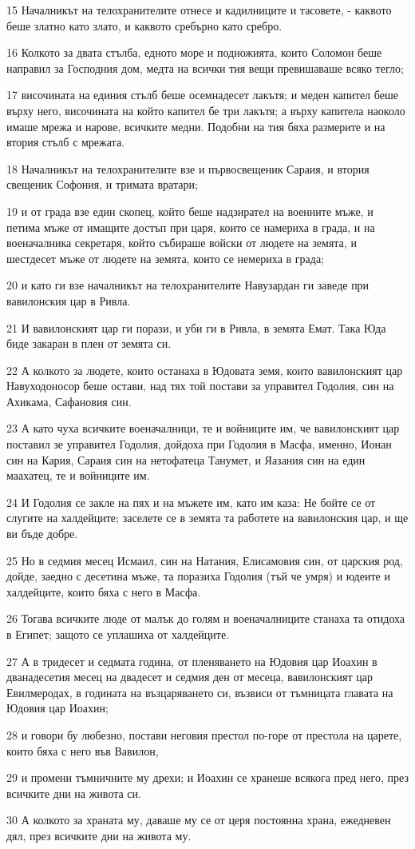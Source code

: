 \par 15 Началникът на телохранителите отнесе и кадилниците и тасовете, - каквото беше златно като злато, и каквото сребърно като сребро.
\par 16 Колкото за двата стълба, едното море и подножията, които Соломон беше направил за Господния дом, медта на всички тия вещи превишаваше всяко тегло;
\par 17 височината на единия стълб беше осемнадесет лакътя; и меден капител беше върху него, височината на който капител бе три лакътя; а върху капитела наоколо имаше мрежа и нарове, всичките медни. Подобни на тия бяха размерите и на втория стълб с мрежата.
\par 18 Началникът на телохранителите взе и първосвещеник Сараия, и втория свещеник Софония, и тримата вратари;
\par 19 и от града взе един скопец, който беше надзирател на военните мъже, и петима мъже от имащите достъп при царя, които се намериха в града, и на военачалника секретаря, който събираше войски от людете на земята, и шестдесет мъже от людете на земята, които се немериха в града;
\par 20 и като ги взе началникът на телохранителите Навузардан ги заведе при вавилонския цар в Ривла.
\par 21 И вавилонският цар ги порази, и уби ги в Ривла, в земята Емат. Така Юда биде закаран в плен от земята си.
\par 22 А колкото за людете, които останаха в Юдовата земя, които вавилонският цар Навуходоносор беше остави, над тях той постави за управител Годолия, син на Ахикама, Сафановия син.
\par 23 А като чуха всичките военачалници, те и войниците им, че вавилонският цар поставил зе управител Годолия, дойдоха при Годолия в Масфа, именно, Ионан син на Кария, Сараия син на нетофатеца Танумет, и Яазания син на един маахатец, те и войниците им.
\par 24 И Годолия се закле на пях и на мъжете им, като им каза: Не бойте се от слугите на халдейците; заселете се в земята та работете на вавилонския цар, и ще ви бъде добре.
\par 25 Но в седмия месец Исмаил, син на Натания, Елисамовия син, от царския род, дойде, заедно с десетина мъже, та поразиха Годолия (тъй че умря) и юдеите и халдейците, които бяха с него в Масфа.
\par 26 Тогава всичките люде от малък до голям и военачалниците станаха та отидоха в Египет; защото се уплашиха от халдейците.
\par 27 А в тридесет и седмата година, от пленяването на Юдовия цар Иоахин в дванадесетия месец на двадесет и седмия ден от месеца, вавилонският цар Евилмеродах, в годината на възцаряването си, възвиси от тъмницата главата на Юдовия цар Иоахин;
\par 28 и говори бу любезно, постави неговия престол по-горе от престола на царете, които бяха с него във Вавилон,
\par 29 и промени тъмничните му дрехи; и Иоахин се хранеше всякога пред него, през всичките дни на живота си.
\par 30 А колкото за храната му, даваше му се от церя постоянна храна, ежедневен дял, през всичките дни на живота му.

